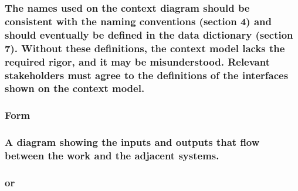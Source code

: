 \documentclass[
]{article}
\begin{document}
\hypertarget{the-names-used-on-the-context-diagram-should-be-consistent-with-the-naming-conventions-section-4-and-should-eventually-be-defined-in-the-data-dictionary-section-7.-without-these-definitions-the-context-model-lacks-the-required-rigor-and-it-may-be-misunderstood.-relevant-stakeholders-must-agree-to-the-definitions-of-the-interfaces-shown-on-the-context-model.}{%
\subsubsection{\texorpdfstring{The names used on the context diagram
should be consistent with the naming conventions (section 4) and should
eventually be defined in the data dictionary (section 7). Without these
definitions, the context model lacks the required rigor, and it may be
misunderstood. Relevant stakeholders must agree to the definitions of
the interfaces shown on the context model.
}{The names used on the context diagram should be consistent with the naming conventions (section 4) and should eventually be defined in the data dictionary (section 7). Without these definitions, the context model lacks the required rigor, and it may be misunderstood. Relevant stakeholders must agree to the definitions of the interfaces shown on the context model. }}\label{the-names-used-on-the-context-diagram-should-be-consistent-with-the-naming-conventions-section-4-and-should-eventually-be-defined-in-the-data-dictionary-section-7.-without-these-definitions-the-context-model-lacks-the-required-rigor-and-it-may-be-misunderstood.-relevant-stakeholders-must-agree-to-the-definitions-of-the-interfaces-shown-on-the-context-model.}}

\hypertarget{form-21}{%
\subsubsection{Form}\label{form-21}}

\hypertarget{a-diagram-showing-the-inputs-and-outputs-that-flow-between-the-work-and-the-adjacent-systems.}{%
\subsubsection{A diagram showing the inputs and outputs that flow
between the work and the adjacent
systems.}\label{a-diagram-showing-the-inputs-and-outputs-that-flow-between-the-work-and-the-adjacent-systems.}}

\hypertarget{or}{%
\subsubsection{or}\label{or}}
\end{document}
